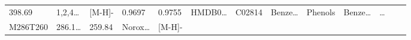 \documentclass[
]{article}
\begin{document}
\begin{longtable}[]{@{}lllllllllllll@{}}
\begin{minipage}[t]{0.05\columnwidth}
398.69\strut
\end{minipage} & \begin{minipage}[t]{0.05\columnwidth}\raggedright
1,2,4\ldots{}\strut
\end{minipage} & \begin{minipage}[t]{0.05\columnwidth}\raggedright
{[}M-H{]}-\strut
\end{minipage} & \begin{minipage}[t]{0.07\columnwidth}\raggedright
0.9697\strut
\end{minipage} & \begin{minipage}[t]{0.07\columnwidth}\raggedright
0.9755\strut
\end{minipage} & \begin{minipage}[t]{0.05\columnwidth}\raggedright
HMDB0\ldots{}\strut
\end{minipage} & \begin{minipage}[t]{0.04\columnwidth}\raggedright
C02814\strut
\end{minipage} & \begin{minipage}[t]{0.05\columnwidth}\raggedright
Benze\ldots{}\strut
\end{minipage} & \begin{minipage}[t]{0.05\columnwidth}\raggedright
Phenols\strut
\end{minipage} & \begin{minipage}[t]{0.05\columnwidth}\raggedright
Benze\ldots{}\strut
\end{minipage} & \begin{minipage}[t]{0.02\columnwidth}\raggedright
\ldots{}\strut
\end{minipage}\tabularnewline
\begin{minipage}[t]{0.05\columnwidth}\raggedright
M286T260\strut
\end{minipage} & \begin{minipage}[t]{0.05\columnwidth}\raggedright
286.1\ldots{}\strut
\end{minipage} & \begin{minipage}[t]{0.05\columnwidth}\raggedright
259.84\strut
\end{minipage} & \begin{minipage}[t]{0.05\columnwidth}\raggedright
Norox\ldots{}\strut
\end{minipage} & \begin{minipage}[t]{0.05\columnwidth}\raggedright
{[}M-H{]}-\strut
\end{minipage} & \begin{minipage}[t]{0.07\columnwidth}\raggedright

\end{minipage}
\end{longtable}
\end{document}
